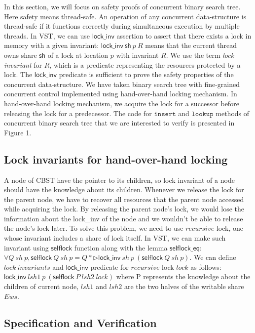\documentclass[acmsmall,screen]{acmart}\settopmatter{printfolios=true}
\begin{document}
In this section, we will focus on safety proofs of concurrent binary search tree. Here safety means thread-safe. An operation of any concurrent data-structure is thread-safe if it functions correctly during simultaneous execution by multiple threads. In VST, we can use $\mathsf{lock\_inv}$ assertion to assert that there exists a lock in memory with a given invariant: $\mathsf{lock\_inv}\ \mathsf{sh}\ p\ R$ means that the current thread owns share $\mathsf{sh}$ of a lock at location $p$ with invariant $R$. We use the term \emph{lock invariant} for $R$, which is a predicate representing the resources protected by a lock. The $\mathsf{lock\_inv}$ predicate is sufficient to prove the safety properties of the concurrent data-structure. We have taken binary search tree with fine-grained concurrent control implemented using hand-over-hand locking mechanism. In hand-over-hand locking mechanism, we acquire the lock for a successor before releasing the lock for a predecessor. The code for $\texttt{insert}$ and $\texttt{lookup}$ methods of concurrent binary search tree that we are interested to verify is presented in Figure 1. 
   
\subsection{Lock invariants for hand-over-hand locking}
A node of CBST have the pointer to its children, so lock invariant of a node should have the knowledge about its children.   
Whenever we release the lock for the parent node, we have to recover all resources that the parent node accessed while acquiring the lock. By releasing the parent node's lock, we would lose the information about the lock\_inv of the node and we wouldn't be able to release the node's lock later. To solve this problem, we need to use $recursive$ lock, one whose invariant includes a share of lock itself. In VST, we can make such invariant using $\mathsf{selflock}$ function along with the lemma $\mathsf{selflock\_eq}$: $\forall Q\ \mathit{sh}\ p, \mathsf{selflock}\ Q\ \mathit{sh}\ p = Q * \triangleright \mathsf{lock\_inv}\ \mathit{sh}\ p\ (\mathsf{selflock}\ Q\ \mathit{sh}\ p)$. We can define $lock\ invariants$ and $\mathsf{lock\_inv}$ predicate for $recursive$ lock $lock$ as follows: $\mathsf{lock\_inv}\ lsh1\ p\ (\mathsf{selflock}\ P\ lsh2\ lock)$ where P represents the knowledge about the children of current node, $lsh1$ and $lsh2$ are the two halves of the writable share $Ews$.

\subsection{Specification and Verification}
\end{document}
